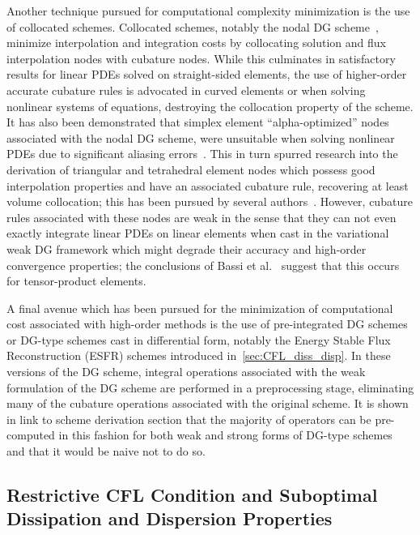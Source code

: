 \documentclass[12pt,Bold,letterpaper,TexShade]{mcgilletdclass}
\numberwithin{equation}{section}
\begin{document}
Another technique pursued for computational complexity minimization is the use of collocated schemes. Collocated schemes, notably the nodal DG scheme~\cite{hesthaven2002,hesthaven2007}, minimize interpolation and integration costs by collocating solution and flux interpolation nodes with cubature nodes. While this culminates in satisfactory results for linear PDEs solved on straight-sided elements, the use of higher-order accurate cubature rules is advocated in curved elements or when solving nonlinear systems of equations, destroying the collocation property of the scheme. It has also been demonstrated that simplex element ``alpha-optimized'' nodes~\cite{warburton2006} associated with the nodal DG scheme, were unsuitable when solving nonlinear PDEs due to significant aliasing errors~\cite{witherden2014}. This in turn spurred research into the derivation of triangular and tetrahedral element nodes which possess good interpolation properties and have an associated cubature rule, recovering at least volume collocation; this has been pursued by several authors~\cite{witherden2014,williams2014b,shunn2012}. However, cubature rules associated with these nodes are weak in the sense that they can not even exactly integrate linear PDEs on linear elements when cast in the variational weak DG framework which might degrade their accuracy and high-order convergence properties; the conclusions of Bassi et al.~\cite{bassi2013} suggest that this occurs for tensor-product elements.

A final avenue which has been pursued for the minimization of computational cost associated with high-order methods is the use of pre-integrated DG schemes~\cite{atkins1996} or DG-type schemes cast in differential form, notably the Energy Stable Flux Reconstruction (ESFR) schemes introduced in~\autoref{sec:CFL_diss_disp}. In these versions of the DG scheme, integral operations associated with the weak formulation of the DG scheme are performed in a preprocessing stage, eliminating many of the cubature operations associated with the original scheme. It is shown in {\color{red} link to scheme derivation section} that the majority of operators can be pre-computed in this fashion for both weak and strong forms of DG-type schemes and that it would be naive not to do so.

\subsection{Restrictive CFL Condition and Suboptimal Dissipation and Dispersion Properties}
\label{sec:CFL_diss_disp}
\end{document}
